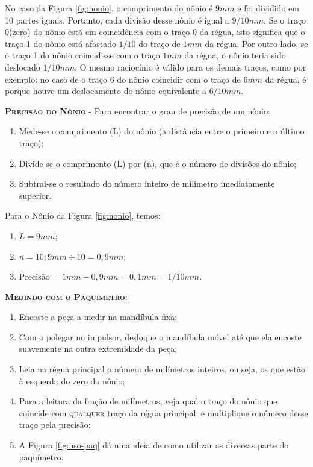 \documentclass[10pt,a4paper,onecolumn,notitlepage]{scrartcl}
\begin{document}
No caso da Figura \ref{fig:nonio}, o comprimento do nônio é $9mm$ e foi dividido em 10 partes iguais. Portanto, cada divisão desse nônio é igual a $9/10mm$. Se o traço 0(zero) do nônio está em coincidência com o traço 0 da régua, isto significa que o traço 1 do nônio está afastado $1/10$ do traço de $1mm$ da régua. Por outro lado, se o traço 1 do nônio coincidisse com o traço $1mm$ da régua, o nônio teria sido deslocado $1/10mm$. O mesmo raciocínio é válido para os demais traços, como por exemplo: no caso de o traço 6 do nônio coincidir com o traço de $6mm$ da régua, é porque houve um deslocamento do nônio equivalente a $6/10mm$.

\textsc{\textbf{Precisão do Nônio}} - Para encontrar o grau de precisão de um nônio:
\begin{enumerate}
\item Mede-se o comprimento (L) do nônio (a distância entre o primeiro e o último traço);
\item Divide-se o comprimento (L) por (n), que é o número de divisões do nônio;
\item Subtrai-se o resultado do número inteiro de milímetro imediatamente superior.
\end{enumerate}


Para o Nônio da Figura \ref{fig:nonio}, temos:
\begin{enumerate}
\item $L = 9mm$;
\item $n=10; 9mm\div 10= 0,9mm$;
\item Precisão = $1mm - 0,9mm = 0,1mm = 1/10mm$.
\end{enumerate}

\textsc{\textbf{Medindo com o Paquímetro}}:
\begin{enumerate}
\item Encoste a peça a medir na mandíbula fixa;
\item Com o polegar no impulsor, desloque o mandíbula móvel até que ela encoste suavemente na outra extremidade da peça;
\item Leia na régua principal o número de milímetros inteiros, ou seja, os que estão à esquerda do zero do nônio;
\item Para a leitura da fração de milímetros, veja qual o traço do nônio que coincide com \textsc{qualquer} traço da régua principal, e multiplique o número desse traço pela precisão;
\item A Figura \ref{fig:uso-paq} dá uma ideia de como utilizar as diversas parte do paquímetro.

\end{enumerate}
\end{document}
